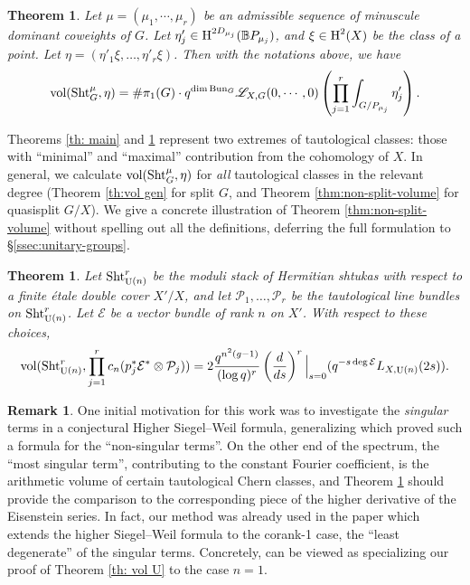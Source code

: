 \documentclass[reqno]{amsart}
\numberwithin{equation}{subsection}
\newtheorem{theorem}[subsubsection]{Theorem}
\theoremstyle{definition}
\newtheorem{remark}[subsubsection]{Remark}
\def\BB{\mathbb{B}}
\newcommand\cE{\mathcal{E}}
\newcommand\cP{\mathcal{P}}
\newcommand{\sL}{{\mathscr{L}}}
\newcommand{\Bun}{\textup{Bun}}
\newcommand\Sht{\textup{Sht}}
\newcommand{\vol}{\textup{vol}}
\DeclareMathOperator{\U}{U}
\newcommand\ot{\otimes}
\newcommand{\cohog}[2]{\textup{H}^{#1}({#2})}     %
\newcommand{\y}{\eta}
\begin{document}
\begin{theorem}\label{thm:intro-2}Let $\mu=(\mu_{1},\cdots, \mu_{r})$ be an admissible sequence of minuscule dominant coweights of $G$. Let $\y'_{j}\in \cohog{2D_{\mu_j}}{\BB P_{\mu_j}}$, and $\xi \in \cohog{2}{X}$ be the class of a point. Let $\eta = (\y'_1 \xi, \ldots, \y'_r \xi)$. Then with the notations above, we have 
\begin{equation}\label{eq:vol eta'}
\vol(\Sht^{\mu}_{G} ,\eta) = \# \pi_1(G) \cdot q^{\dim \Bun_{G}}\sL_{X,G}(0,\cdots, 0)\left( \prod_{j=1}^r\int_{G/P_{\mu_j}} \eta_j'\right).
\end{equation}
\end{theorem}

Theorems \ref{th: main} and \ref{thm:intro-2} represent two extremes of tautological classes: those with ``minimal'' and ``maximal'' contribution from the cohomology of $X$. In general, we calculate $
\vol(\Sht^{\mu}_{G} , \eta)$ for \emph{all} tautological classes in the relevant degree (Theorem \ref{th:vol gen} for split $G$, and Theorem \ref{thm:non-split-volume} for quasisplit $G/X$). We give a concrete illustration of Theorem \ref{thm:non-split-volume} without spelling out all the definitions, deferring the full formulation to \S \ref{ssec:unitary-groups}. 

\begin{theorem}\label{th:intro-vol-U}
Let $\Sht^r_{\U(n)}$ be the moduli stack of Hermitian shtukas with respect to a finite \'etale double cover $X'/X$, and let $\cP_1, \ldots, \cP_r$ be the tautological line bundles on $\Sht^r_{\U(n)}$. Let $\cE$ be a vector bundle of rank $n$ on $X'$. With respect to these choices,
\begin{equation*}
\vol(\Sht_{\U(n)}^r, \prod_{j=1}^{r}c_{n}(p_{j}^{*}\cE^{*}\ot\cP_j)) =2\frac{q^{n^{2}(g-1)}}{(\log q)^{r}}\left(\frac{d}{ds}\right)^{r}\Big|_{s=0}(q^{-s\deg \cE}L_{X,\U(n)}(2s)).
\end{equation*}
\end{theorem}


\begin{remark}
    One initial motivation for this work was to investigate the \emph{singular} terms in a conjectural Higher Siegel--Weil formula, generalizing \cite{FYZ} which proved such a formula for the ``non-singular terms''. On the other end of the spectrum, the ``most singular term'', contributing to the constant Fourier coefficient, is the arithmetic volume of certain tautological Chern classes, and Theorem \ref{th:intro-vol-U} should provide the comparison to the corresponding piece of the higher derivative of the Eisenstein series. In fact, our method was already used in the paper \cite{FHM25} which extends the higher Siegel--Weil formula to the corank-1 case, the ``least degenerate'' of the singular terms. Concretely, \cite[\S 7]{FHM25} can be viewed as specializing our proof of Theorem \ref{th: vol U} to the case $n=1$. 
\end{remark}
\end{document}
